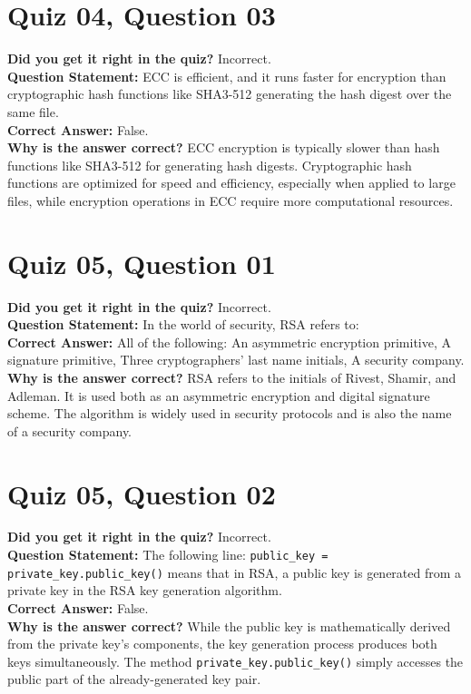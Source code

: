 \documentclass{article}
\begin{document}
\vspace{1em}

\section*{Quiz 04, Question 03}
\textbf{Did you get it right in the quiz?} Incorrect. \\
\textbf{Question Statement:} ECC is efficient, and it runs faster for encryption than cryptographic hash functions like SHA3-512 generating the hash digest over the same file. \\
\textbf{Correct Answer:} False. \\
\textbf{Why is the answer correct?} ECC encryption is typically slower than hash functions like SHA3-512 for generating hash digests. Cryptographic hash functions are optimized for speed and efficiency, especially when applied to large files, while encryption operations in ECC require more computational resources.


\vspace{1em}

\section*{Quiz 05, Question 01}
\textbf{Did you get it right in the quiz?} Incorrect. \\
\textbf{Question Statement:} In the world of security, RSA refers to: \\
\textbf{Correct Answer:} All of the following: An asymmetric encryption primitive, A signature primitive, Three cryptographers' last name initials, A security company. \\
\textbf{Why is the answer correct?} RSA refers to the initials of Rivest, Shamir, and Adleman. It is used both as an asymmetric encryption and digital signature scheme. The algorithm is widely used in security protocols and is also the name of a security company.

\vspace{1em}

\section*{Quiz 05, Question 02}
\textbf{Did you get it right in the quiz?} Incorrect. \\
\textbf{Question Statement:} The following line: \texttt{public\_key = private\_key.public\_key()} means that in RSA, a public key is generated from a private key in the RSA key generation algorithm. \\
\textbf{Correct Answer:} False. \\
\textbf{Why is the answer correct?} While the public key is mathematically derived from the private key's components, the key generation process produces both keys simultaneously. The method \texttt{private\_key.public\_key()} simply accesses the public part of the already-generated key pair.
\end{document}
